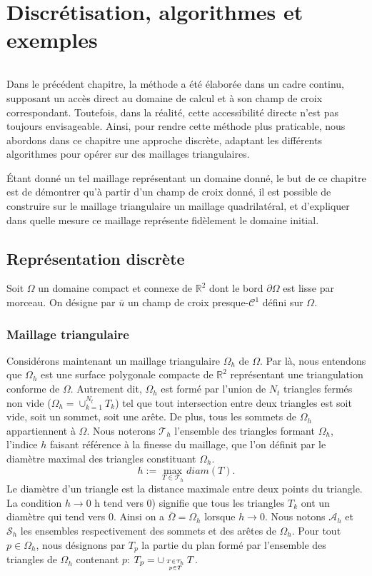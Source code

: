 \chapter{Discrétisation, algorithmes et exemples}
\label{chap:alorithme}
\minitoc

\[\]

Dans le précédent chapitre, la méthode a été élaborée dans un cadre continu, supposant un accès direct au domaine de calcul et à son champ de croix correspondant. Toutefois, dans la réalité, cette accessibilité directe n'est pas toujours envisageable. Ainsi, pour rendre cette méthode plus praticable, nous abordons dans ce chapitre une approche discrète, adaptant les différents algorithmes pour opérer sur des maillages triangulaires.

\'Etant donné un tel maillage représentant un domaine donné, le but de ce chapitre est de démontrer qu'à partir d'un champ de croix donné, il est possible de construire sur le maillage triangulaire un maillage quadrilatéral, et d'expliquer dans quelle mesure ce maillage représente fidèlement le domaine initial.

\section{Représentation discrète}
\label{sec:repr_discrete}
Soit $\Omega$ un domaine compact et connexe de $\mathbb{R}^2$ dont le bord $\partial\Omega$ est lisse par morceau. On désigne par $\bar{u}$ un champ de croix presque-$\mathcal{C}^1$ défini sur $\Omega$.

\subsection{Maillage triangulaire}
\label{subsec:mesh_tri}

Considérons maintenant un maillage triangulaire $\Omega_h$ de $\Omega$. Par là, nous entendons que $\Omega_h$ est une surface polygonale compacte de $\mathbb{R}^2$ représentant une triangulation conforme de $\Omega$. Autrement dit, $\Omega_h$ est formé par l'union de $N_t$ triangles fermés non vide ($\Omega_h=\cup_{k=1}^{N_t}T_k$) tel que tout intersection entre deux triangles est soit vide, soit un sommet, soit une arête. De plus, tous les sommets de $\Omega_h$ appartiennent à $\Omega$. Nous noterons $\mathcal{T}_h$ l'ensemble des triangles formant $\Omega_h$, l'indice $h$ faisant référence à la finesse du maillage, que l’on définit par le diamètre maximal des triangles constituant $\Omega_h$.
$$
h:=\max_{T\in\mathcal{T}_h} diam(T).
$$
Le diamètre d’un triangle est la distance maximale entre deux points du triangle. La condition $h\rightarrow 0$ h tend vers 0) signifie que tous les triangles $T_k$ ont un diamètre qui tend vers $0$. Ainsi on a $\bar{\Omega}=\Omega_h$ lorsque $h\rightarrow 0$. Nous notons $\mathcal{A}_h$ et $\mathcal{S}_h$ les ensembles respectivement des sommets et des arêtes de $\Omega_h$. Pour tout $p\in\Omega_h$, nous désignons par $T_p$ la partie du plan formé par l'ensemble des triangles de $\Omega_h$ contenant $p$: $T_p=\displaystyle\cup_{T\in\mathcal{T}_h\atop~p\in T~}T$.

